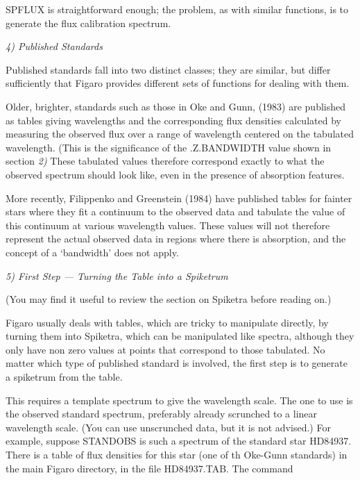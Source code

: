 SPFLUX is straightforward enough; the problem, as with similar
functions, is to generate the flux calibration spectrum.


\goodbreak
\vspace{12pt}
{\it 4) Published Standards}

Published standards fall into two distinct classes; they are
similar, but differ sufficiently that Figaro provides different sets
of functions for dealing with them.

Older, brighter, standards such as those in Oke and Gunn, (1983) 
are published as tables giving wavelengths and the corresponding flux
densities calculated by measuring the observed flux over a range
of wavelength centered on the tabulated wavelength.  (This is the
significance of the .Z.BANDWIDTH value shown in section {\it 2)}  These
tabulated values therefore correspond exactly to what the observed
spectrum should look like, even in the presence of absorption features.

More recently, Filippenko and Greenstein (1984) have published
tables for fainter stars where they fit a continuum to the observed
data and tabulate the value of this continuum at various wavelength values.
These values will not therefore represent the actual observed data in
regions where there is absorption, and the concept of a `bandwidth'
does not apply.


\goodbreak
\vspace{12pt}
{\it 5) First Step --- Turning the Table into a Spiketrum}

(You may find it useful to review the section on Spiketra before
reading on.)

Figaro usually deals with tables, which are tricky to manipulate
directly, by turning them into Spiketra, which can be manipulated like 
spectra, although
they only have non zero values at points that correspond to those 
tabulated.  No matter which type of published standard is involved, the
first step is to generate a spike\-trum from the table.

This requires a template spectrum to give the wavelength scale.  The
one to use is the observed standard spectrum, preferably already scrunched
to a linear wavelength scale.  (You can use unscrunched data, but it is not
advised.)  For example, suppose STANDOBS is such a spectrum of the standard
star HD84937.  There is a table of flux densities for this star (one of
th Oke-Gunn standards) in the main Figaro directory, in the file
HD84937.TAB.  The command

